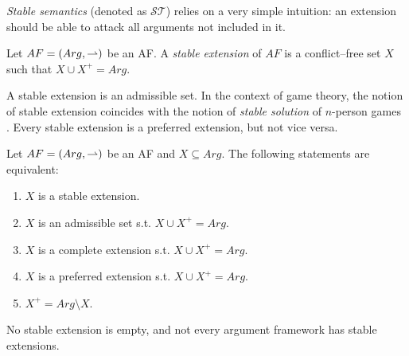 \textit{Stable semantics} (denoted as {\color{purple}$\mathcal{ST}$}) relies on a very simple intuition: 
an extension should be able to attack all arguments not included in it.


\begin{df}
    Let $AF=(Arg,\rightharpoonup)$ be an AF. 
    A \textit{stable extension}  of $AF$ is a conflict--free set $X$ such that $X \cup X^+ = Arg$. 
\end{df}


A stable extension is an admissible set.
% 
In the context of game theory, 
the notion of stable extension coincides with the notion of \textit{stable solution} of $n$-person games \cite{Dun1995}. 
% 
Every stable extension is a preferred extension, 
but not vice versa. 


\begin{prop}
    Let $AF=(Arg,\rightharpoonup)$ be an AF and $X \subseteq Arg$. 
    The following statements are equivalent:
    \begin{enumerate}[itemsep=5pt,parsep=5pt,leftmargin=3em,topsep=5pt,label=(\arabic*)] 
        \item $X$ is a stable extension. 
        
        \item $X$ is an admissible set s.t. $X \cup X^+ = Arg$.
        
        \item $X$ is a complete extension s.t. $X \cup X^+ = Arg$.
        
        \item $X$ is a preferred extension s.t. $X \cup X^+ = Arg$.
        
        \item $X^+ = Arg \setminus X$.
    \end{enumerate}
\end{prop}


No stable extension is empty, 
and not every argument framework has stable extensions.



